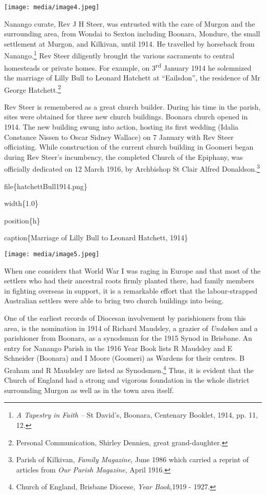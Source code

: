 \texttt{[image: media/image4.jpeg]}

Nanango curate, Rev J H Steer, was entrusted with the care of Murgon and
the surrounding area, from Wondai to Sexton including Boonara, Mondure,
the small settlement at Murgon, and Kilkivan, until 1914. He travelled
by horseback from Nanango.\footnote{\emph{A Tapestry in Faith --} St
  David's, Boonara, Centenary Booklet, 1914, pp. 11, 12.} Rev Steer
diligently brought the various sacraments to central homesteads or
private homes. For example, on 3\textsuperscript{rd} January 1914 he
solemnized the marriage of Lilly Bull to Leonard Hatchett at
``Eailsdon'', the residence of Mr George Hatchett.\footnote{Personal
  Communication, Shirley Dennien, great grand-daughter.}

Rev Steer is remembered as a great church builder. During his time in
the parish, sites were obtained for three new church buildings. Boonara
church opened in 1914. The new building swung into action, hosting its
first wedding (Idalia Constance Nissen to Oscar Sidney Wallace) on 7
January with Rev Steer officiating. While construction of the current
church building in Goomeri began during Rev Steer's incumbency, the
completed Church of the Epiphany, was officially dedicated on 12 March
1916, by Archbishop St Clair Alfred Donaldson.\footnote{Parish of
  Kilkivan, \emph{Family Magazine}, June 1986 which carried a reprint of
  articles from \emph{Our Parish Magazine}, April 1916.}

file\{hatchettBull1914.png\}

width\{1.0\}

position\{h\}

caption\{Marriage of Lilly Bull to Leonard Hatchett, 1914\}

\texttt{[image: media/image5.jpeg]}

When one considers that World War I was raging in Europe and that most
of the settlers who had their ancestral roots firmly planted there, had
family members in fighting overseas in support, it is a remarkable
effort that the labour-strapped Australian settlers were able to bring
two church buildings into being.

One of the earliest records of Diocesan involvement by parishioners from
this area, is the nomination in 1914 of Richard Maudsley, a grazier of
\emph{Undaban} and a parishioner from Boonara, as a synodsman for the
1915 Synod in Brisbane. An entry for Nanango Parish in the 1916 Year
Book lists R Maudsley and E Schneider (Boonara) and I Moore (Goomeri) as
Wardens for their centres. B Graham and R Maudsley are listed as
Synodsmen.\footnote{Church of England, Brisbane Diocese, \emph{Year
  Book,}1919 - 1927.} Thus, it is evident that the Church of England had
a strong and vigorous foundation in the whole district surrounding
Murgon as well as in the town area itself.

